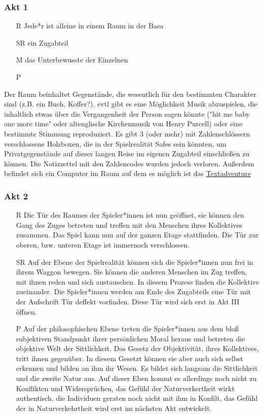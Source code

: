 \documentclass[a4paper, 12pt]{scrartcl}
\begin{document}
    \subsubsection{Akt 1}
   \begin{itemize}
   \item[R] Jede*r ist alleine in einem Raum in der Basa
   \item[SR] ein Zugabteil 
   \item[M] das Unterbewusste der Einzelnen
   \item[P] 
   \end{itemize}
   Der Raum beinhaltet Gegenstände, die wesentlich für den bestimmten Charakter sind (z.B. ein Buch, Koffer?), evtl gibt es eine Möglichkeit Musik abzuspielen, die inhaltlich etwas über die Vergangenheit der Person sagen könnte ("hit me baby one more time" oder altenglische Kirchenmusik von Henry Purcell) oder eine bestimmte Stimmung reproduziert.
     Es gibt 3 (oder mehr) mit Zahlenschlössern verschlossene Holzboxen, die in der Spielrealität Safes sein könnten, um Privatgegenstände auf dieser langen Reise im eigenen Zugabteil einschließen zu können.
    Die Notizzettel mit den Zahlencodes wurden jedoch verloren.
    Außerdem befindet sich ein Computer im Raum auf dem es möglich ist das \hyperref[textadventure]{Textadventure}
    
    \subsubsection{Akt 2}
    \begin{itemize}
    \item[R] Die Tür des Raumes der Spieler*innen ist nun geöffnet, sie können den Gang des Zuges betreten und treffen mit den Menschen ihres Kollektives zusammen.
    Das Spiel kann nun auf der ganzen Etage stattfinden. 
    Die Tür zur oberen, bzw. unteren Etage ist immernoch verschlossen.
    \item[SR] Auf der Ebene der Spielrealität können sich die Spieler*innen nun frei in ihrem Waggon bewegen. 
    Sie können die anderen Menschen im Zug treffen, mit ihnen reden und sich austauschen. 
    In diesem Prozess finden die Kollektive zueinander.
    Die Spieler*innen werden am Ende des Zugabteils eine Tür mit der Aufschrift \glqq Tür deffekt\grqq{} vorfinden.
    Diese Tür wird sich erst in Akt III öffnen.
    \item[P] Auf der philosophischen Ebene treten die Spieler*innen aus dem bloß subjektiven Standpunkt ihrer persönlichen Moral heraus und betreten die objektive Welt der Sittlichkeit.
    Das Gesetz der Objektivität, ihres Kollektives, tritt ihnen gegenüber.
    In diesem Gesetzt können sie aber auch sich selbst erkennen und bilden an ihm ihr Wesen. 
    Es bildet sich langsam die Sittlichkeit und die zweite Natur aus.
    Auf dieser Eben kommt es allerdings noch nicht zu Konflikten und Widersprüchen, das Gefühl der Naturverkertheit wirkt authentisch, die Individuen geraten noch nicht mit ihm in Konfilt, das Gefühl der in Naturverkehrtheit wird erst im nächsten Akt entwickelt.
    \end{itemize}
\end{document}
